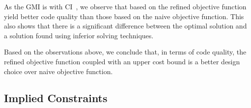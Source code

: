 As the \gls{GMI} is \printGMI{%
  \ObjFunRefinedVsNaiveCyclesSpeedupRefinedVsNaiveWUbCyclesRegularSpeedupGmean%
} with \gls{CI}~\printGMICI{%
  \ObjFunRefinedVsNaiveCyclesSpeedupRefinedVsNaiveWUbCyclesRegularSpeedupCiMin%
}{%
  \ObjFunRefinedVsNaiveCyclesSpeedupRefinedVsNaiveWUbCyclesRegularSpeedupCiMax%
}, we observe that  based on the refined
\gls{objective function} yield better code quality than those based on the naive
\gls{objective function}.
%
This also shows that there is a significant difference between the optimal
\gls{solution} and a \gls{solution} found using inferior solving techniques.

Based on the observations above, we conclude that, in terms of code quality, the
refined \gls{objective function} coupled with an upper cost bound is a better
design choice over naive \gls{objective function}.


\subsection{Implied Constraints}



\newsavebox{\solvTechPlot}
\newlength{\solvTechPlotW}
\newlength{\solvTechSubfigW}

